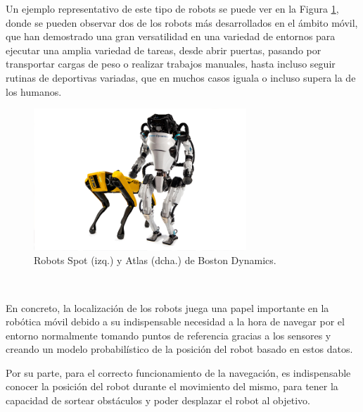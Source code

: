 Un ejemplo representativo de este tipo de robots se puede ver en la Figura
\ref{fig:boston_dynamics}, donde se pueden observar dos de los robots más
desarrollados en el ámbito móvil, que han demostrado una gran versatilidad en
una variedad de entornos para ejecutar una amplia variedad de tareas, desde
abrir puertas, pasando por transportar cargas de peso o realizar trabajos
manuales, hasta incluso seguir rutinas de deportivas variadas, que en muchos
casos iguala o incluso supera la de los humanos.

\begin{figure} [h!]
  \begin{center}
    \includegraphics[width=8cm]{figs/atlas_spot_boston_dynamics}
  \end{center}
  \caption{Robots Spot (izq.) y Atlas (dcha.) de Boston Dynamics.}
  \label{fig:boston_dynamics}
\end{figure}\

En concreto, la localización de los robots juega una papel importante en la
robótica móvil debido a su indispensable necesidad a la hora de navegar por el
entorno normalmente tomando puntos de referencia gracias a los sensores y
creando un modelo probabilístico de la posición del robot basado en estos datos.

Por su parte, para el correcto funcionamiento de la navegación, es indispensable
conocer la posición del robot durante el movimiento del mismo, para tener la
capacidad de sortear obstáculos y poder desplazar el robot al objetivo.

